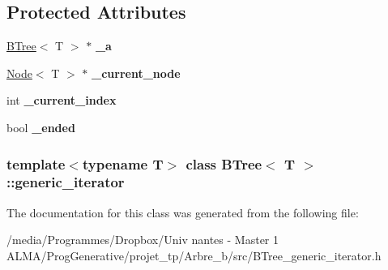 \subsection*{Protected Attributes}
\begin{DoxyCompactItemize}
\item 
\hypertarget{classBTree_1_1generic__iterator_a6ec022efe90f4ca0604ceb484ecd1d0a}{
\hyperlink{classBTree}{BTree}$<$ T $>$ $\ast$ {\bfseries \_\-a}}
\label{classBTree_1_1generic__iterator_a6ec022efe90f4ca0604ceb484ecd1d0a}

\item 
\hypertarget{classBTree_1_1generic__iterator_add0b6a4ea520884526d5691973050111}{
\hyperlink{classNode}{Node}$<$ T $>$ $\ast$ {\bfseries \_\-current\_\-node}}
\label{classBTree_1_1generic__iterator_add0b6a4ea520884526d5691973050111}

\item 
\hypertarget{classBTree_1_1generic__iterator_a0e98920f5074c48dba1eedcba094d35a}{
int {\bfseries \_\-current\_\-index}}
\label{classBTree_1_1generic__iterator_a0e98920f5074c48dba1eedcba094d35a}

\item 
\hypertarget{classBTree_1_1generic__iterator_a8f79d7c072e1c7ce51c3373120c44348}{
bool {\bfseries \_\-ended}}
\label{classBTree_1_1generic__iterator_a8f79d7c072e1c7ce51c3373120c44348}

\end{DoxyCompactItemize}
\subsubsection*{template$<$typename T$>$ class BTree$<$ T $>$::generic\_\-iterator}



The documentation for this class was generated from the following file:\begin{DoxyCompactItemize}
\item 
/media/Programmes/Dropbox/Univ nantes -\/ Master 1 ALMA/ProgGenerative/projet\_\-tp/Arbre\_\-b/src/BTree\_\-generic\_\-iterator.h\end{DoxyCompactItemize}
